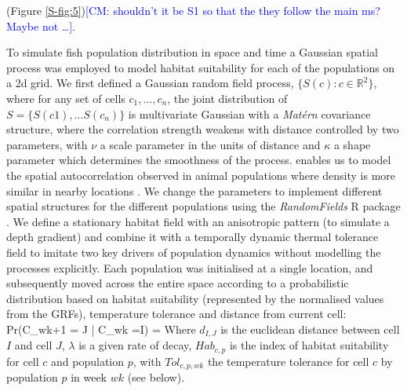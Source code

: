 \documentclass[review]{elsarticle}
\let\oldequation\equation
\let\oldendequation\endequation
\renewenvironment{equation}
 {\linenomathNonumbers\oldequation}
 {\oldendequation\endlinenomath}
\begin{document}
(Figure \ref{S-fig:5})\textcolor{blue}{[CM: shouldn't it be S1 so that the they follow the main ms? Maybe not \dots]}.

To simulate fish population distribution in space and time a Gaussian spatial
process was employed to model habitat suitability for each of the populations
on a 2d grid.  We first defined a Gaussian random field process, $\{S(c) : c
\in \mathbb{R}^2\}$, where for any set of cells $c_{1}, \dots, c_{n}$, the
joint distribution of $S = \{S(c1),\dots S(c_{n})\}$ is multivariate Gaussian
with a \textit{Matérn} covariance structure, where the correlation strength
weakens with distance controlled by two parameters, with $\nu$ a scale
parameter in the units of distance and $\kappa$ a shape parameter which
determines the smoothness of the process.  enables us to model the spatial autocorrelation
observed in animal populations where density is more similar in nearby
locations
\citep{Tobler1970, F.Dormann2007, Poos2007}. We change the parameters to
implement different spatial structures for the different populations using the
\textit{RandomFields} R package \citep{Schlater2015}. We define a stationary
habitat field with an anisotropic pattern (to simulate a depth gradient) and
combine it with a temporally dynamic thermal tolerance field to imitate two key
drivers of population dynamics without modelling the processes explicitly. Each
population was initialised at a single location, and subsequently moved across
the entire space according to a probabilistic distribution based on habitat
suitability (represented by the normalised values from the GRFs), temperature
tolerance and distance from current cell: 
\begin{equation}
	Pr(C_{wk+1} = J | C_{wk} =I) = 
\end{equation}
Where $d_{I,J}$ is the euclidean distance between cell $I$ and cell $J$,
$\lambda$ is a given rate of decay, $Hab_{c,p}$ is the index of habitat
suitability for cell $c$ and population $p$, with $Tol_{c,p,wk}$ the
temperature tolerance for cell $c$ by population $p$ in week $wk$ (see below).
\\
\end{document}

